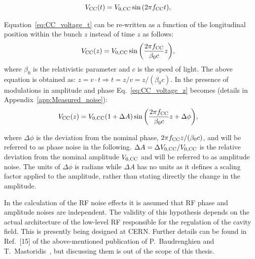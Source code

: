 \begin{equation}\label{eq:CC_voltage_t}
    V_\mathrm{CC}(t) = {V_\mathrm{0, CC}} \sin{\left ( 2 \pi {f_\mathrm{CC}}t \right )},
\end{equation}

Equation~\eqref{eq:CC_voltage_t} can be re-written as a function of the longitudinal position within the bunch $z$ instead of time $z$ as follows:
\begin{equation}\label{eq:CC_voltage_z}
    V_\mathrm{CC}(z) = {V_\mathrm{0, CC}} \sin{\left ( \frac{2\pi {f_\mathrm{CC}}}{\beta_0 c}z \right )},
\end{equation}
where $\beta_0$ is the relativistic parameter and $c$ is the speed of light. The above equation is obtained as: $z=v \cdot t \Rightarrow t=z/v=z/(\beta_0 c)$.
In the presence of modulations in amplitude and phase Eq.~\eqref{eq:CC_voltage_z} becomes (details in Appendix~\ref{app:Measured_noise}):
\begin{equation}\label{eq:CC_voltage_z}
    V_\mathrm{CC}(z) = {V_\mathrm{0, CC}} (1+\Delta A) \sin{\left ( \frac{2\pi {f_\mathrm{CC}}}{\beta_0 c}z + \Delta \phi \right )},
\end{equation}

where $\Delta \phi$ is the deviation from the nominal phase, $2\pi {f_\mathrm{CC}} z/(\beta_0 c)$, and will be referred to as phase noise in the following. $\Delta A = \Delta {V_\mathrm{0, CC}} / {V_\mathrm{0, CC}}$ is the relative deviation from the nominal amplitude ${V_\mathrm{0, CC}}$ and will be referred to as amplitude noise. The units of $\Delta \phi$ is radians while $\Delta A$ has no units as it defines a scaling factor applied to the amplitude, rather than stating directly the change in the amplitude.


In the calculation of the RF noise effects it is assumed that RF phase and amplitude noises are independent. The validity of this hypothesis depends on the actual architecture of the low-level RF responsible for the regulation of the cavity field. This is presently being designed at CERN. Further details can be found in Ref.~[15] of the above-mentioned publication of P.~Baudrenghien and T.~Mastoridis~\cite{PhysRevSTAB.18.101001}, but discussing them is out of the scope of this thesis.
 

